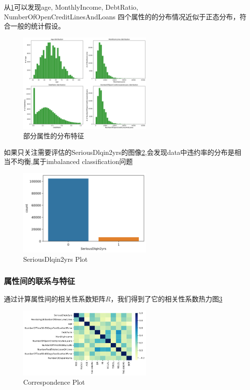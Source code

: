 \documentclass[UTF8,a4paper,10pt]{ctexart}
\begin{document}
从\ref*{4}可以发现age, MonthlyIncome, DebtRatio, NumberOfOpenCreditLinesAndLoans 四个属性的的分布情况近似于正态分布，符合一般的统计假设。

\begin{figure}[htbp]
	\centering
	\includegraphics[width=0.6\textwidth]{dist.png} %
	\caption{部分属性的分布特征} %
	\label{4} %
\end{figure}

如果只关注需要评估的SeriousDlqin2yrs的图像\ref*{5},会发现data中违约率的分布是相当不均衡,属于imbalanced classification问题

\begin{figure}[htbp]
	\centering
	\includegraphics[width=0.6\textwidth]{ser.png} %
	\caption{SeriousDlqin2yrs Plot} %
	\label{5} %
\end{figure}


\subsubsection{属性间的联系与特征}
通过计算属性间的相关性系数矩阵$R$，我们得到了它的相关性系数热力图\ref*{6}

\begin{figure}[htbp]
	\centering
	\includegraphics[width=0.6\textwidth]{cor.png} %
	\caption{Correspondence Plot} %
	\label{6} %
\end{figure}
\end{document}
